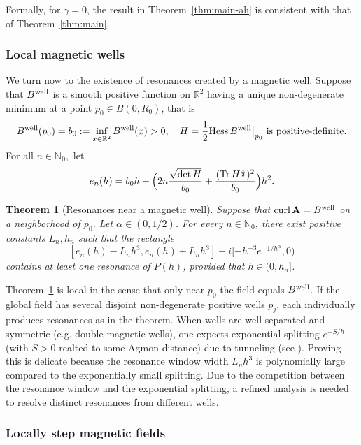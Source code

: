 \documentclass[11pt]{amsart}
\newtheorem{theorem}{Theorem}[section]
\theoremstyle{remark}
\newcommand{\bA}{\mathbf{A}}
\newcommand{\R}{\mathbb{R}}
\DeclareMathOperator{\Curl}{curl}
\numberwithin{equation}{section}
\begin{document}
Formally, for $\gamma=0$, the result in Theorem~\ref{thm:main-ah} is consistent with that of Theorem~\ref{thm:main}.

\subsubsection*{Local magnetic wells}

We turn now to the existence of  resonances created by a magnetic well. Suppose that $B^{\rm well}$ is a smooth  positive function on $\R^2$ having a unique non-degenerate minimum at a point $p_0\in B(0,R_0)$, that is
\begin{equation}\label{eq:m-well}
 B^{\rm well}(p_0)=b_0:=\inf_{x\in\R^2}B^{\rm well}(x)>0,\quad H=\frac12\mathrm{Hess}\,B^{\rm well}\big|_{p_0}\mbox{ is positive-definite}.   
\end{equation}
For all $n\in\mathbb N_0,$ let
\[e_n(h)=b_0h+\Bigl(2n\frac{\sqrt{\mathrm{det}\,H}}{b_0}+\frac{(\mathrm{Tr}\,H^{\frac12})^2}{b_0}\Bigr)h^2.\]


\begin{theorem}[Resonances near a magnetic well]\label{thm:main**}
Suppose that $\Curl\bA=B^{\rm well}$ on a neighborhood of $p_0$. Let $\alpha\in(0,1/2)$. For every $n\in\mathbb N_0$, there exist positive constants $L_n,h_n$ such that
    the rectangle
\[
 [e_n(h) - L_nh^{3}, e_n(h) + L_nh^{3}] + i[-h^{-3}e^{-1/h^{\alpha}}, 0)
\]
contains at least one resonance of $P(h)$, provided that $h\in(0,h_n]$.
\end{theorem}



Theorem~\ref{thm:main**} is local in the sense that only near $p_0$ the field equals $B^{\rm well}$. If the global field has several disjoint non-degenerate positive wells $p_j$, each individually produces resonances as in the theorem. When wells are well separated and symmetric (e.g. double magnetic wells), one expects exponential splitting $e^{-S/h}$ (with $S>0$ realted to some Agmon distance) due to tunneling (see \cite{EM, FGMR, FMR}). Proving this is delicate because the resonance window width $L_n h^3$ is polynomially large compared to the exponentially small splitting. Due to the competition between the resonance window and the exponential splitting,  a refined analysis is needed to resolve distinct resonances from different wells.

\subsubsection*{Locally step magnetic fields}
\end{document}
